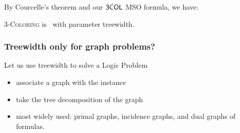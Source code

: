 \begin{frame}
	
	\noindent
	By Courcelle's theorem and our $\mathsf{3COL}$ MSO formula, we have:
	\begin{theorem}
		\textsc{3-Coloring} is \FPT\ with parameter treewidth.
	\end{theorem}
\end{frame}


\begin{frame}
  \frametitle{Treewidth only for graph problems?}
  
  \noindent
  Let us use treewidth to solve a Logic Problem
  \begin{itemize}
  \item associate a graph with the instance
  \item take the tree decomposition of the graph
  \item most widely used: primal graphs, incidence graphs, and dual graphs of formulas.
  \end{itemize}
\end{frame}


